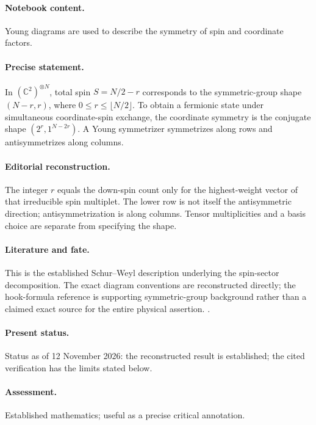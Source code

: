 \paragraph{Notebook content.} Young diagrams are used to describe the symmetry of spin and coordinate factors.

\paragraph{Precise statement.} In $(\mathbb C^2)^{\otimes N}$, total spin $S=N/2-r$ corresponds to the symmetric-group shape $(N-r,r)$, where $0\leq r\leq\lfloor N/2\rfloor$. To obtain a fermionic state under simultaneous coordinate-spin exchange, the coordinate symmetry is the conjugate shape $(2^r,1^{N-2r})$. A Young symmetrizer symmetrizes along rows and antisymmetrizes along columns.

\paragraph{Editorial reconstruction.} The integer $r$ equals the down-spin count only for the highest-weight vector of that irreducible spin multiplet. The lower row is not itself the antisymmetric direction; antisymmetrization is along columns. Tensor multiplicities and a basis choice are separate from specifying the shape.

\paragraph{Literature and fate.} This is the established Schur--Weyl description underlying the spin-sector decomposition. The exact diagram conventions are reconstructed directly; the hook-formula reference is supporting symmetric-group background rather than a claimed exact source for the entire physical assertion. \citep{yang1967manybody,framerobinsonthrall1954hook}.

\paragraph{Present status.} Status as of 12 November 2026: the reconstructed result is established; the cited verification has the limits stated below.

\paragraph{Assessment.} Established mathematics; useful as a precise critical annotation.

